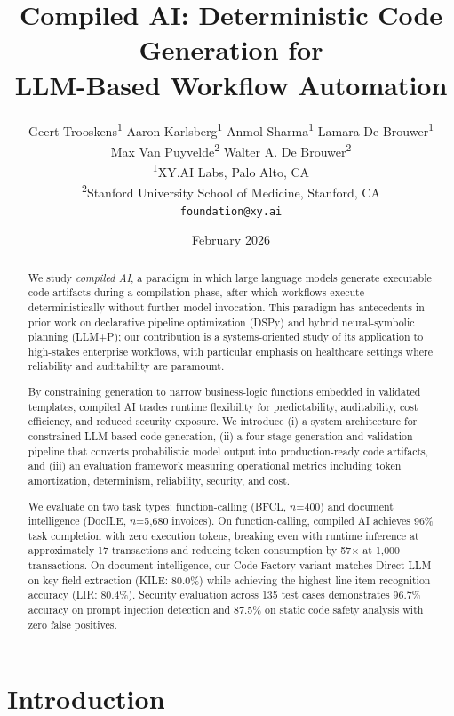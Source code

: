 \documentclass[11pt]{article}
\title{Compiled AI: Deterministic Code Generation for\\LLM-Based Workflow Automation}
\author{
  Geert Trooskens\textsuperscript{1} \quad
  Aaron Karlsberg\textsuperscript{1} \quad
  Anmol Sharma\textsuperscript{1} \quad
  Lamara De Brouwer\textsuperscript{1} \\[0.3em]
  Max Van Puyvelde\textsuperscript{2} \quad
  Walter A. De Brouwer\textsuperscript{2}
  \\[1em]
  \textsuperscript{1}XY.AI Labs, Palo Alto, CA \\
  \textsuperscript{2}Stanford University School of Medicine, Stanford, CA \\[0.5em]
  \texttt{foundation@xy.ai}
}
\date{February 2026}
\begin{document}
\maketitle

\begin{abstract}

We study \emph{compiled AI}, a paradigm in which large language models generate executable code artifacts during a compilation phase, after which workflows execute deterministically without further model invocation. This paradigm has antecedents in prior work on declarative pipeline optimization (DSPy) and hybrid neural-symbolic planning (LLM+P); our contribution is a systems-oriented study of its application to high-stakes enterprise workflows, with particular emphasis on healthcare settings where reliability and auditability are paramount.

By constraining generation to narrow business-logic functions embedded in validated templates, compiled AI trades runtime flexibility for predictability, auditability, cost efficiency, and reduced security exposure. We introduce (i) a system architecture for constrained LLM-based code generation, (ii) a four-stage generation-and-validation pipeline that converts probabilistic model output into production-ready code artifacts, and (iii) an evaluation framework measuring operational metrics including token amortization, determinism, reliability, security, and cost.

We evaluate on two task types: function-calling (BFCL, $n$=400) and document intelligence (DocILE, $n$=5,680 invoices). On function-calling, compiled AI achieves 96\% task completion with zero execution tokens, breaking even with runtime inference at approximately 17 transactions and reducing token consumption by 57$\times$ at 1,000 transactions. On document intelligence, our Code Factory variant matches Direct LLM on key field extraction (KILE: 80.0\%) while achieving the highest line item recognition accuracy (LIR: 80.4\%). Security evaluation across 135 test cases demonstrates 96.7\% accuracy on prompt injection detection and 87.5\% on static code safety analysis with zero false positives.

\end{abstract}

\section{Introduction}
\label{sec:introduction}
\end{document}
